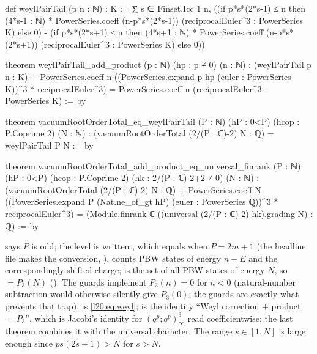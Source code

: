 \begin{leancode}
def weylPairTail (p n : ℕ) : K :=
  ∑ s ∈ Finset.Icc 1 n,
    ((if p*s*(2*s-1) ≤ n then
      (4*s-1 : ℕ) * PowerSeries.coeff (n-p*s*(2*s-1)) (reciprocalEuler^3 : PowerSeries K)
      else 0) -
    (if p*s*(2*s+1) ≤ n then
      (4*s+1 : ℕ) * PowerSeries.coeff (n-p*s*(2*s+1)) (reciprocalEuler^3 : PowerSeries K)
      else 0))

theorem weylPairTail_add_product (p : ℕ) (hp : p ≠ 0) (n : ℕ) :
    (weylPairTail p n : K) + PowerSeries.coeff n
        ((PowerSeries.expand p hp (euler : PowerSeries K))^3 * reciprocalEuler^3) =
      PowerSeries.coeff n (reciprocalEuler^3 : PowerSeries K) := by

theorem vacuumRootOrderTotal_eq_weylPairTail (P : ℕ) (hP : 0<P)
    (hcop : P.Coprime 2) (N : ℕ) :
    (vacuumRootOrderTotal (2/(P : ℂ)-2) N : ℚ) = weylPairTail P N := by

theorem vacuumRootOrderTotal_add_product_eq_universal_finrank (P : ℕ) (hP : 0<P)
    (hcop : P.Coprime 2) (hk : 2/(P : ℂ)-2+2 ≠ 0) (N : ℕ) :
    (vacuumRootOrderTotal (2/(P : ℂ)-2) N : ℚ) +
      PowerSeries.coeff N
        ((PowerSeries.expand P (Nat.ne_of_gt hP) (euler : PowerSeries ℚ))^3 * reciprocalEuler^3) =
      (Module.finrank ℂ ((universal (2/(P : ℂ)-2) hk).grading N) : ℚ) := by
\end{leancode}

\begin{dictionary}
 says $P$ is odd; the level is written , which equals  when
$P=2m+1$ (the headline file makes the conversion, ).  counts PBW states of
energy $n-E$ and the correspondingly shifted charge;  is the set of all PBW states of energy $N$, so
 $=P_3(N)$ (). The  guards
implement $P_3(n)=0$ for $n<0$ (natural-number subtraction would otherwise silently give $P_3(0)$; the guards are
exactly what prevents that trap).  is \eqref{l20:eq:weyl};  is the
identity ``Weyl correction $+$ product $=P_3$'', which is Jacobi's identity for $(q^p;q^p)^3_\infty$ read coefficientwise;
the last theorem combines it with the universal character. The range $s\in[1,N]$ is large enough since
$ps(2s-1)>N$ for $s>N$.
\end{dictionary}

